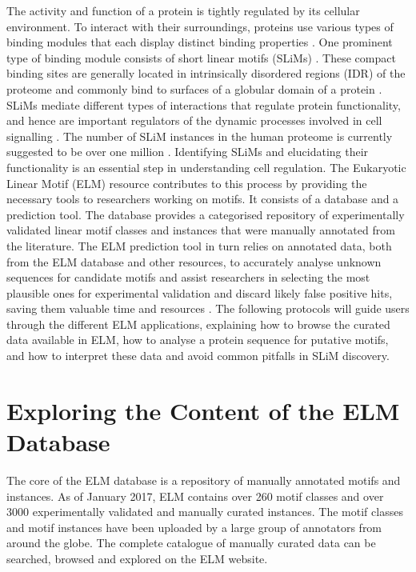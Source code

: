 \documentclass[12pt]{article}
\newcounter{proto}
\begin{document}
The activity and function of a protein is tightly regulated by its
cellular environment. To interact with their surroundings, proteins use
various types of binding modules that each display distinct binding
properties \citep{10550212}. One prominent type of binding module
consists of short linear motifs (SLiMs) \citep{18508681}. These compact
binding sites are generally located in intrinsically disordered regions
(IDR) of the proteome and commonly bind to
surfaces of a globular domain of a protein \citep{21909575}. SLiMs mediate
different types of interactions that regulate protein functionality, and hence
are important regulators of the dynamic processes involved in cell
signalling \citep{22480932} \citep{24926813}. The number of
SLiM instances in the human proteome is currently suggested to be over
one million \citep{25038412}. Identifying SLiMs and elucidating their
functionality is an essential step in understanding cell regulation. The
Eukaryotic Linear Motif (ELM) resource contributes to this process by
providing the necessary tools to researchers working on motifs. It
consists of a database and a prediction tool. The database provides a
categorised repository of experimentally validated linear motif classes
and instances that were manually annotated from the literature. The ELM
prediction tool in turn relies on annotated data, both from the ELM
database and other resources, to accurately analyse unknown sequences
for candidate motifs and assist researchers in selecting the most
plausible ones for experimental validation and discard likely false
positive hits, saving them valuable time and resources \citep{22110040}.
The following protocols will guide users through the different ELM
applications, explaining how to browse the curated data available in
ELM, how to analyse a protein sequence for putative motifs, and how to
interpret these data and avoid common pitfalls in SLiM discovery.


	\section{Exploring the Content of the ELM Database}%
	\label{sec:explore_content}%

	The core of the ELM database is a repository of manually annotated motifs and
	instances. As of January 2017, ELM contains over 260 motif classes and over
	3000 experimentally validated and manually curated instances.
	The motif classes and motif instances have been uploaded by a large group of
	annotators from around the globe. The complete catalogue of manually curated
	data can be searched, browsed and explored on the ELM website.
\end{document}
